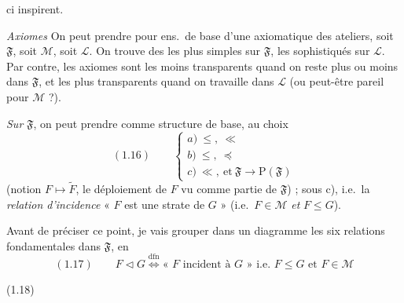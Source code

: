 \documentclass[11pt,a4paper]{article}
\begin{document}
ci inspirent.

\emph{Axiomes} On peut prendre pour ens.\ de base d'une axiomatique des ateliers, soit $\mathfrak{F}$, soit $\mathcal{M}$, soit $\mathcal{L}$. On trouve des \ill{} les plus simples sur $\mathfrak{F}$, les  sophistiqués sur $\mathcal{L}$. Par contre, les axiomes  sont les moins transparents quand on reste plus ou moins dans $\mathfrak{F}$, et les plus transparents quand on travaille dans $\mathcal{L}$ (ou peut-être pareil pour $\mathcal{M}$ ?).

\emph{Sur} $\mathfrak{F}$, on peut prendre comme structure de base, au choix
\[
  (1.16) \qquad
  \begin{cases}
    a)\ \leq,\ \ll \\
    b)\ \leq,\ \preccurlyeq \\
    c)\ \ll,\ \text{et}\ \mathfrak{F} \to \mathrm{P}(\mathfrak{F})
  \end{cases}
\]
(notion $F \mapsto \widetilde{F}$, le déploiement de $F$ vu comme partie de $\mathfrak{F}$)  ; sous c), i.e.\ la \emph{relation d'incidence} « $F$ est une strate de $G$ » (i.e.\ $F \in \mathcal{M}$ \emph{et} $F \leq G$).

 Avant de préciser ce point, je vais grouper dans un diagramme les six relations fondamentales dans $\mathfrak{F}$, en 
\[
  (1.17) \qquad F \mathrel{\triangleleft} G \overset{\mathrm{dfn}}{\iff} \text{« $F$ incident à $G$ » i.e. } F \leq G \text{ et } F \in \mathcal{M}
\]

(1.18)

\end{document}
